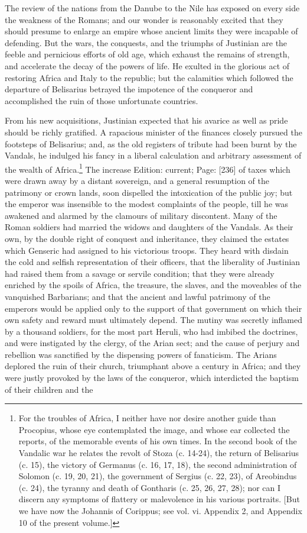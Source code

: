 The review of the nations from the Danube to the Nile has exposed on every side the weakness of the Romans; and our wonder is reasonably excited that they should presume to enlarge an empire whose ancient limits they were incapable of defending. But the wars, the conquests, and the triumphs of Justinian are the feeble and pernicious efforts of old age, which exhaust the remains of strength, and accelerate the decay of the powers of life. He exulted in the glorious act of restoring Africa and Italy to the republic; but the calamities which followed the departure of Belisarius betrayed the impotence of the conqueror and accomplished the ruin of those unfortunate countries.

From his new acquisitions, Justinian expected that his avarice as well as pride should be richly gratified. A rapacious minister of the finances closely pursued the footsteps of Belisarius; and, as the old registers of tribute had been burnt by the Vandals, he indulged his fancy in a liberal calculation and arbitrary assessment of the wealth of Africa.\footnote{For the troubles of Africa, I neither have nor desire another guide than Procopius, whose eye contemplated the image, and whose ear collected the reports, of the memorable events of his own times. In the second book of the Vandalic war he relates the revolt of Stoza (c. 14-24), the return of Belisarius (c. 15), the victory of Germanus (c. 16, 17, 18), the second administration of Solomon (c. 19, 20, 21), the government of Sergius (c. 22, 23), of Areobindus (c. 24), the tyranny and death of Gontharis (c. 25, 26, 27, 28); nor can I discern any symptoms of flattery or malevolence in his various portraits. [But we have now the Johannis of Corippus; see vol. vi. Appendix 2, and Appendix 10 of the present volume.]} The increase Edition: current; Page: [236] of taxes which were drawn away by a distant sovereign, and a general resumption of the patrimony or crown lands, soon dispelled the intoxication of the public joy; but the emperor was insensible to the modest complaints of the people, till he was awakened and alarmed by the clamours of military discontent. Many of the Roman soldiers had married the widows and daughters of the Vandals. As their own, by the double right of conquest and inheritance, they claimed the estates which Genseric had assigned to his victorious troops. They heard with disdain the cold and selfish representation of their officers, that the liberality of Justinian had raised them from a savage or servile condition; that they were already enriched by the spoils of Africa, the treasure, the slaves, and the moveables of the vanquished Barbarians; and that the ancient and lawful patrimony of the emperors would be applied only to the support of that government on which their own safety and reward must ultimately depend. The mutiny was secretly inflamed by a thousand soldiers, for the most part Heruli, who had imbibed the doctrines, and were instigated by the clergy, of the Arian sect; and the cause of perjury and rebellion was sanctified by the dispensing powers of fanaticism. The Arians deplored the ruin of their church, triumphant above a century in Africa; and they were justly provoked by the laws of the conqueror, which interdicted the baptism of their children and the 